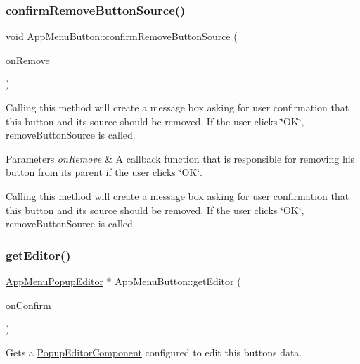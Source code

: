 \subsubsection{\texorpdfstring{confirm\+Remove\+Button\+Source()}{confirmRemoveButtonSource()}}
{\footnotesize\ttfamily void App\+Menu\+Button\+::confirm\+Remove\+Button\+Source (\begin{DoxyParamCaption}\item[{const std\+::function$<$ void() $>$ \&}]{on\+Remove }\end{DoxyParamCaption})}

Calling this method will create a message box asking for user confirmation that this button and its source should be removed. If the user clicks \char`\"{}\+O\+K\char`\"{}, remove\+Button\+Source is called.


\begin{DoxyParams}{Parameters}
{\em on\+Remove} & A callback function that is responsible for removing his button from its parent if the user clicks \char`\"{}\+O\+K\char`\"{}.\\
\hline
\end{DoxyParams}
Calling this method will create a message box asking for user confirmation that this button and its source should be removed. If the user clicks \char`\"{}\+O\+K\char`\"{}, remove\+Button\+Source is called. \mbox{\label{classAppMenuButton_a388243c4b6afa532afce4352e35bfec4}} 
\subsubsection{\texorpdfstring{get\+Editor()}{getEditor()}}
{\footnotesize\ttfamily \mbox{\hyperlink{classAppMenuPopupEditor}{App\+Menu\+Popup\+Editor}} $\ast$ App\+Menu\+Button\+::get\+Editor (\begin{DoxyParamCaption}\item[{const std\+::function$<$ void(\mbox{\hyperlink{classAppMenuPopupEditor}{App\+Menu\+Popup\+Editor}} $\ast$) $>$ \&}]{on\+Confirm }\end{DoxyParamCaption})}

Gets a \mbox{\hyperlink{classPopupEditorComponent}{Popup\+Editor\+Component}} configured to edit this button\textquotesingle{}s data.


